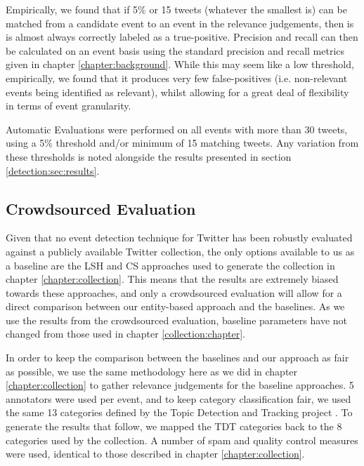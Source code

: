 Empirically, we found that if 5\% or 15 tweets (whatever the smallest is) can be matched from a candidate event to an event in the relevance judgements, then is is almost always correctly labeled as a true-positive.
Precision and recall can then be calculated on an event basis using the standard precision and recall metrics given in chapter \ref{chapter:background}.
While this may seem like a low threshold, empirically, we found that it produces very few false-positives (i.e. non-relevant events being identified as relevant), whilst allowing for a great deal of flexibility in terms of event granularity.

Automatic Evaluations were performed on all events with more than 30 tweets, using a 5\% threshold and/or minimum of 15 matching tweets.
Any variation from these thresholds is noted alongside the results presented in section \ref{detection:sec:results}.

\subsection{Crowdsourced Evaluation}
\label{sec:baseline}
\label{detection:sec:crowd}
Given that no event detection technique for Twitter has been robustly evaluated against a publicly available Twitter collection, the only options available to us as a baseline are the LSH \citep{Petrovic10} and CS \citep{Aggarwal12} approaches used to generate the collection in chapter \ref{chapter:collection}.
This means that the results are extremely biased towards these approaches, and only a crowdsourced evaluation will allow for a direct comparison between our entity-based approach and the baselines.
As we use the results from the crowdsourced evaluation, baseline parameters have not changed from those used in chapter \ref{collection:chapter}.

In order to keep the comparison between the baselines and our approach as fair as possible, we use the same methodology here as we did in chapter \ref{chapter:collection} to gather relevance judgements for the baseline approaches.
5 annotators were used per event, and to keep category classification fair, we used the same 13 categories defined by the Topic Detection and Tracking project \citep{Allan:2002:ITD:772260.772262}.
To generate the results that follow, we mapped the TDT categories back to the 8 categories used by the collection.
A number of spam and quality control measures were used, identical to those described in chapter \ref{chapter:collection}.

